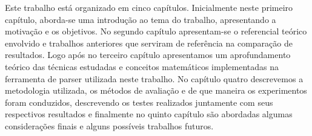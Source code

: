 Este trabalho está organizado em cinco capítulos. Inicialmente neste primeiro capítulo, aborda-se uma introdução ao tema do trabalho, apresentando a motivação e os objetivos. No segundo capítulo apresentam-se o referencial teórico envolvido e trabalhos anteriores que serviram de referência na comparação de resultados. Logo após no terceiro capítulo apresentamos um aprofundamento teórico das técnicas estudadas e conceitos matemáticos implementadas na ferramenta de parser utilizada neste trabalho. No capítulo quatro descrevemos a metodologia utilizada, os métodos de avaliação e de que maneira os experimentos foram conduzidos, descrevendo os testes realizados juntamente com seus respectivos resultados e finalmente no quinto capítulo são abordadas algumas considerações finais e alguns possíveis trabalhos futuros.
